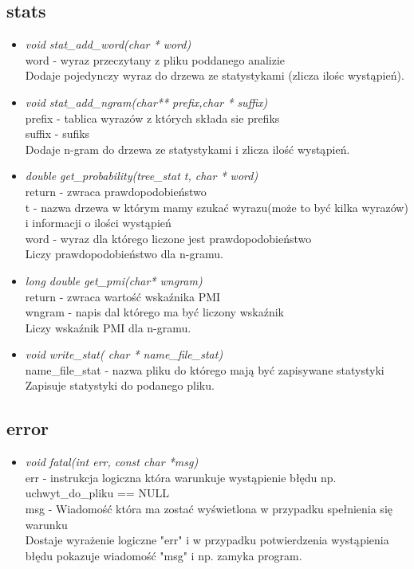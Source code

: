 \documentclass[12pt,a4paper]{report}
\begin{document}
	\subsection*{stats}
		\begin{itemize}
			
			\item \textit{void stat\_add\_word(char * word)} \\
			word - wyraz przeczytany z pliku poddanego analizie \\
			Dodaje pojedynczy wyraz do drzewa ze statystykami (zlicza ilośc wystąpień).
			
			\item \textit{void stat\_add\_ngram(char** prefix,char * suffix)}\\
			prefix - tablica wyrazów z których składa sie prefiks \\
			suffix - sufiks \\
			Dodaje n-gram do drzewa ze statystykami i zlicza ilość wystąpień.
			
			\item \textit{double get\_probability(tree\_stat t, char * word)}\\
			return - zwraca prawdopodobieństwo \\
			t - nazwa drzewa w którym mamy szukać wyrazu(może to być kilka wyrazów) i informacji o ilości wystąpień \\
			word - wyraz dla którego liczone jest prawdopodobieństwo \\
			Liczy prawdopodobieństwo dla n-gramu.
			
			\item \textit{long double get\_pmi(char* wngram)}\\
			return - zwraca wartość wskaźnika PMI \\
			wngram - napis dal którego ma być liczony wskaźnik \\
			Liczy wskaźnik PMI dla n-gramu.
			
			\item \textit{void write\_stat( char * name\_file\_stat)}\\
			name\_file\_stat - nazwa pliku do którego mają być zapisywane statystyki
			Zapisuje statystyki do podanego pliku.
			
		\end{itemize}
	\subsection*{error} 
		\begin{itemize}
			
			\item \textit{void fatal(int err, const char *msg)}\\
			err - instrukcja logiczna która warunkuje wystąpienie błędu np. uchwyt\_do\_pliku == NULL \\
			msg - Wiadomość która ma zostać wyświetlona w przypadku spełnienia się warunku \\
			Dostaje wyrażenie logiczne "err" i w przypadku potwierdzenia wystąpienia błędu pokazuje wiadomość "msg" i np. zamyka program.
		\end{itemize}
\end{document}
